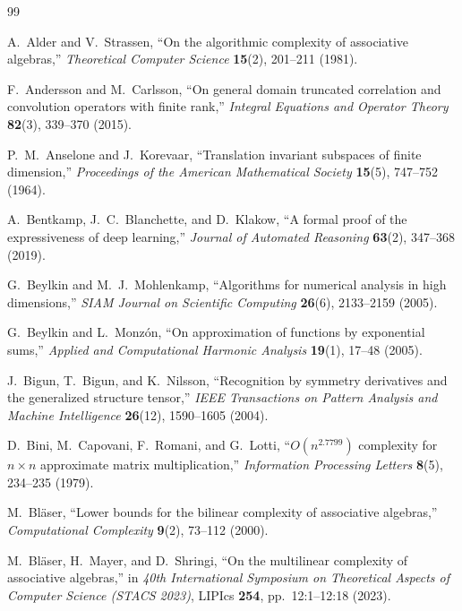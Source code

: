\documentclass[11pt,a4paper]{article}
\theoremstyle{plain}
\theoremstyle{definition}
\begin{document}
\begin{thebibliography}{99}\sloppy

A.~Alder and V.~Strassen,
``On the algorithmic complexity of associative algebras,''
\emph{Theoretical Computer Science} \textbf{15}(2), 201--211 (1981).

F.~Andersson and M.~Carlsson,
``On general domain truncated correlation and convolution operators with finite rank,''
\emph{Integral Equations and Operator Theory} \textbf{82}(3), 339--370 (2015).

P.~M.~Anselone and J.~Korevaar,
``Translation invariant subspaces of finite dimension,''
\emph{Proceedings of the American Mathematical Society} \textbf{15}(5), 747--752 (1964).

A.~Bentkamp, J.~C.~Blanchette, and D.~Klakow,
``A formal proof of the expressiveness of deep learning,''
\emph{Journal of Automated Reasoning} \textbf{63}(2), 347--368 (2019).

G.~Beylkin and M.~J.~Mohlenkamp,
``Algorithms for numerical analysis in high dimensions,''
\emph{SIAM Journal on Scientific Computing} \textbf{26}(6), 2133--2159 (2005).

G.~Beylkin and L.~Monz\'on,
``On approximation of functions by exponential sums,''
\emph{Applied and Computational Harmonic Analysis} \textbf{19}(1), 17--48 (2005).

J.~Bigun, T.~Bigun, and K.~Nilsson,
``Recognition by symmetry derivatives and the generalized structure tensor,''
\emph{IEEE Transactions on Pattern Analysis and Machine Intelligence} \textbf{26}(12), 1590--1605 (2004).

D.~Bini, M.~Capovani, F.~Romani, and G.~Lotti,
``$O(n^{2.7799})$ complexity for $n \times n$ approximate matrix multiplication,''
\emph{Information Processing Letters} \textbf{8}(5), 234--235 (1979).

M.~Bl\"aser,
``Lower bounds for the bilinear complexity of associative algebras,''
\emph{Computational Complexity} \textbf{9}(2), 73--112 (2000).

M.~Bl\"aser, H.~Mayer, and D.~Shringi,
``On the multilinear complexity of associative algebras,''
in \emph{40th International Symposium on Theoretical Aspects of Computer Science (STACS 2023)}, LIPIcs \textbf{254}, pp.~12:1--12:18 (2023).


\end{thebibliography}
\end{document}
